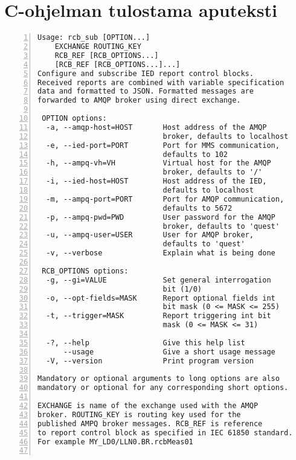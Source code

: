 \chapter{C-ohjelman tulostama aputeksti}
\label{ch:rcb-sub-help-output}

\begin{lstlisting}[caption={rcb\_sub-ohjelman aputeksti.},label={lst:json-rakenne}, numbers=left]
Usage: rcb_sub [OPTION...]
	EXCHANGE ROUTING_KEY
	RCB_REF [RCB_OPTIONS...]
	[RCB_REF [RCB_OPTIONS...]...]
Configure and subscribe IED report control blocks.
Received reports are combined with variable specification
data and formatted to JSON. Formatted messages are
forwarded to AMQP broker using direct exchange.

 OPTION options:
  -a, --amqp-host=HOST       Host address of the AMQP
                             broker, defaults to localhost
  -e, --ied-port=PORT        Port for MMS communication,
                             defaults to 102
  -h, --ampq-vh=VH           Virtual host for the AMQP
                             broker, defaults to '/'
  -i, --ied-host=HOST        Host address of the IED,
                             defaults to localhost
  -m, --ampq-port=PORT       Port for AMQP communication,
                             defaults to 5672
  -p, --ampq-pwd=PWD         User password for the AMQP
                             broker, defaults to 'quest'
  -u, --ampq-user=USER       User for AMQP broker,
                             defaults to 'quest'
  -v, --verbose              Explain what is being done

 RCB_OPTIONS options:
  -g, --gi=VALUE             Set general interrogation
                             bit (1/0)
  -o, --opt-fields=MASK      Report optional fields int
                             bit mask (0 <= MASK <= 255)
  -t, --trigger=MASK         Report triggering int bit
                             mask (0 <= MASK <= 31)

  -?, --help                 Give this help list
      --usage                Give a short usage message
  -V, --version              Print program version

Mandatory or optional arguments to long options are also
mandatory or optional for any corresponding short options.

EXCHANGE is name of the exchange used with the AMQP
broker. ROUTING_KEY is routing key used for the
published AMPQ broker messages. RCB_REF is reference
to report control block as specified in IEC 61850 standard.
For example MY_LD0/LLN0.BR.rcbMeas01


\end{lstlisting}
